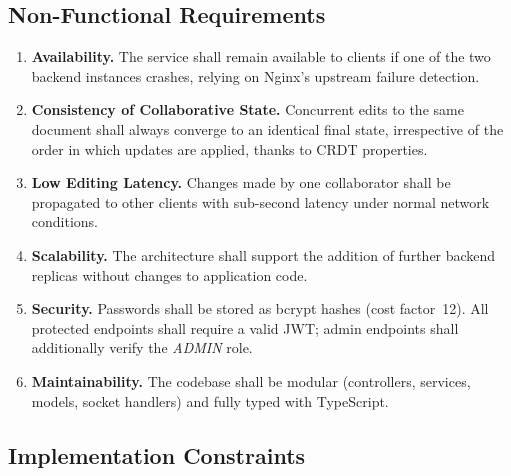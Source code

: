 \documentclass{scrartcl}
\begin{document}
  \subsection{Non-Functional Requirements}

  \begin{enumerate}
    \item[\textbf{NFR-1}] \textbf{Availability.} The service shall remain available to clients
    if one of the two backend instances crashes, relying on Nginx's upstream failure detection.

    \item[\textbf{NFR-2}] \textbf{Consistency of Collaborative State.} Concurrent edits to
    the same document shall always converge to an identical final state, irrespective of the
    order in which updates are applied, thanks to CRDT properties.

    \item[\textbf{NFR-3}] \textbf{Low Editing Latency.} Changes made by one collaborator shall
    be propagated to other clients with sub-second latency under normal network conditions.

    \item[\textbf{NFR-4}] \textbf{Scalability.} The architecture shall support the addition of
    further backend replicas without changes to application code.

    \item[\textbf{NFR-5}] \textbf{Security.} Passwords shall be stored as bcrypt hashes (cost
    factor~12). All protected endpoints shall require a valid JWT; admin endpoints shall
    additionally verify the \textit{ADMIN} role.

    \item[\textbf{NFR-6}] \textbf{Maintainability.} The codebase shall be modular (controllers,
    services, models, socket handlers) and fully typed with TypeScript.
  \end{enumerate}

  \subsection{Implementation Constraints}
\end{document}
